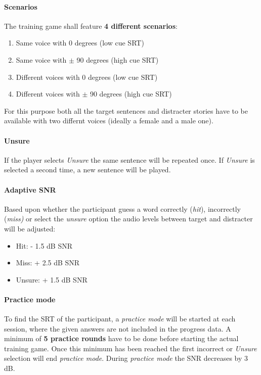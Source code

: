 \documentclass[a4paper,11pt]{article}%
\renewcommand{\\}{\vspace*{0.5\baselineskip} \newline}
\begin{document}
\paragraph{Scenarios} The training game shall feature \textbf{4 different scenarios}:
\begin{enumerate}
\item Same voice with 0 degrees (low cue \ac{SRT})
\item Same voice with $\pm$ 90 degrees (high cue \ac{SRT})
\item Different voices with 0 degrees (low cue \ac{SRT})
\item Different voices with $\pm$ 90 degrees (high cue \ac{SRT})
\end{enumerate}
For this purpose both all the target sentences and distracter stories have to be available with two differnt voices (ideally a female and a male one).

\paragraph{Unsure} If the player selects \textit{Unsure} the same sentence will be repeated once. If \textit{Unsure} is selected a second time, a new sentence will be played.

\paragraph{Adaptive SNR} Based upon whether the participant guess a word correctly (\textit{hit}), incorrectly (\textit{miss)} or select the \textit{unsure} option the audio levels between target and distracter will be adjusted:
\begin{itemize}
\item Hit: - 1.5 dB SNR
\item Miss: + 2.5 dB SNR
\item Unsure: + 1.5 dB SNR
\end{itemize}

\paragraph{Practice mode} To find the \ac{SRT} of the participant, a \textit{practice mode} will be started at each session, where the given answers are not included in the progress data. A minimum of \textbf{5 practice rounds} have to be done before starting the actual training game. Once this minimum has been reached the first incorrect or \textit{Unsure} selection will end \textit{practice mode}. During \textit{practice mode} the \ac{SNR} decreases by 3 dB.
\end{document}
